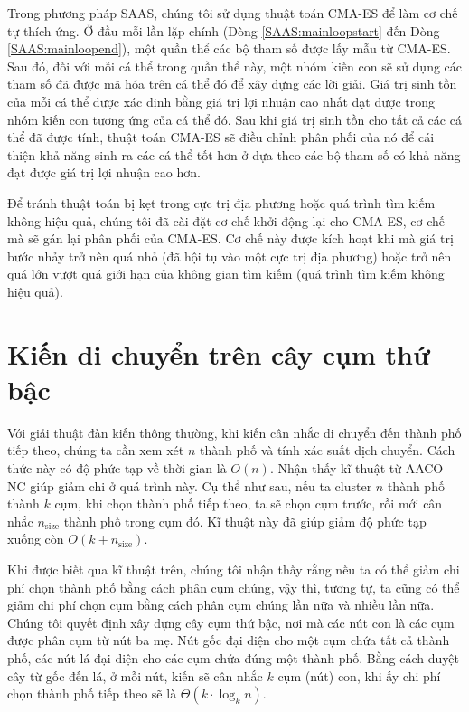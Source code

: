Trong phương pháp SAAS, chúng tôi sử dụng thuật toán CMA-ES để làm cơ chế tự thích ứng. Ở đầu mỗi lần lặp chính (Dòng \ref{SAAS:mainloopstart} đến Dòng \ref{SAAS:mainloopend}), một quần thể các bộ tham số được lấy mẫu từ CMA-ES. Sau đó, đối với mỗi cá thể trong quần thể này, một nhóm kiến con sẽ sử dụng các tham số đã được mã hóa trên cá thể đó để xây dựng các lời giải. Giá trị sinh tồn của mỗi cá thể được xác định bằng giá trị lợi nhuận cao nhất đạt được trong nhóm kiến con tương ứng của  cá thể đó. Sau khi giá trị sinh tồn cho tất cả các cá thể đã được tính, thuật toán CMA-ES sẽ điều chỉnh phân phối của nó để cái thiện khả năng sinh ra các cá thể tốt hơn ở dựa theo các bộ tham số có khả năng đạt được giá trị lợi nhuận cao hơn.

Để tránh thuật toán bị kẹt trong cực trị địa phương hoặc quá trình tìm kiếm không hiệu quả, chúng tôi đã cài đặt cơ chế khởi động lại cho CMA-ES, cơ chế mà sẽ gán lại phân phối của CMA-ES. Cơ chế này được kích hoạt khi mà giá trị bước nhảy trở nên quá nhỏ (đã hội tụ vào một cực trị địa phương) hoặc trở nên quá lớn vượt quá giới hạn của không gian tìm kiếm (quá trình tìm kiếm không hiệu quả).

\section{Kiến di chuyển trên cây cụm thứ bậc}\label{section:AntTraversalClusterTrees}
Với giải thuật đàn kiến thông thường, khi kiến cân nhắc di chuyển đến thành phố tiếp theo, chúng ta cần xem xét $n$ thành phố và tính xác suất dịch chuyển. Cách thức này có độ phức tạp về thời gian là $O(n)$. Nhận thấy kĩ thuật từ AACO-NC \cite{STODOLA2022101056} giúp giảm chi ở quá trình này. Cụ thể như sau, nếu ta cluster $n$ thành phố thành $k$ cụm, khi chọn thành phố tiếp theo, ta sẽ chọn cụm trước, rồi mới cân nhắc $n_\mathrm{size}$ thành phố trong cụm đó. Kĩ thuật này đã giúp giảm độ phức tạp xuống còn $O(k + n_\mathrm{size})$.

Khi được biết qua kĩ thuật trên, chúng tôi nhận thấy rằng nếu ta có thể giảm chi phí chọn thành phố bằng cách phân cụm chúng, vậy thì, tương tự, ta cũng có thể giảm chi phí chọn cụm bằng cách phân cụm chúng lần nữa và nhiều lần nữa. Chúng tôi quyết định xây dựng cây cụm thứ bậc, nơi mà các nút con là các cụm được phân cụm từ nút ba mẹ. Nút gốc đại diện cho một cụm chứa tất cả thành phố, các nút lá đại diện cho các cụm chứa đúng một thành phố. Bằng cách duyệt cây từ gốc đến lá, ở mỗi nút, kiến sẽ cân nhắc $k$ cụm (nút) con, khi ấy chi phí chọn thành phố tiếp theo sẽ là $\Theta(k \cdot \log_{k} n)$.

